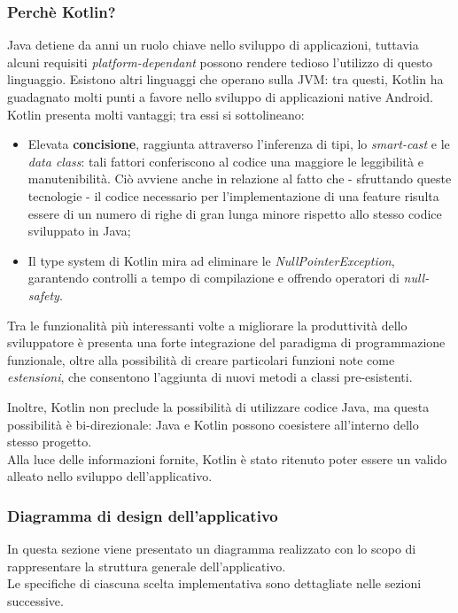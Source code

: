 \documentclass{natourDoc}
\begin{document}
\subsubsection{Perchè Kotlin?}
Java detiene da anni un ruolo chiave nello sviluppo di applicazioni, tuttavia alcuni requisiti \textit{platform-dependant}
possono rendere tedioso l'utilizzo di questo linguaggio. Esistono altri linguaggi che operano sulla JVM: tra questi, Kotlin ha guadagnato
molti punti a favore nello sviluppo di applicazioni native Android. \\

Kotlin presenta molti vantaggi; tra essi si sottolineano:
\begin{itemize}
	\item Elevata \textbf{concisione}, raggiunta attraverso l'inferenza di tipi, lo \textit{smart-cast} e le \textit{data class}:
	      tali fattori conferiscono al codice una maggiore le leggibilità e manutenibilità. Ciò avviene anche in relazione al fatto che - sfruttando queste
	      tecnologie - il codice necessario per l'implementazione di una feature risulta essere di un numero di righe di gran lunga minore rispetto allo stesso codice sviluppato in Java; \\
	\item Il type system di Kotlin mira ad eliminare le \textit{NullPointerException}, garantendo controlli a tempo di compilazione e offrendo
	      operatori di \textit{null-safety}.
\end{itemize}

Tra le funzionalità più interessanti volte a migliorare la produttività dello sviluppatore è presenta una forte integrazione del paradigma di
programmazione funzionale, oltre alla possibilità di creare particolari funzioni note come \textit{estensioni}, che consentono l'aggiunta
di nuovi metodi a classi pre-esistenti.

Inoltre, Kotlin non preclude la possibilità di utilizzare codice Java, ma questa possibilità è bi-direzionale: Java e Kotlin possono coesistere
all'interno dello stesso progetto. \\

Alla luce delle informazioni fornite, Kotlin è stato ritenuto poter essere un valido alleato nello sviluppo dell'applicativo.

\newpage

\subsubsection{Diagramma di design dell'applicativo}
In questa sezione viene presentato un diagramma realizzato con lo scopo di rappresentare la struttura generale dell'applicativo. \\
Le specifiche di ciascuna scelta implementativa sono dettagliate nelle sezioni successive.
\begin{figure}[!htbp]
	\centering
	
\end{figure}
\end{document}
